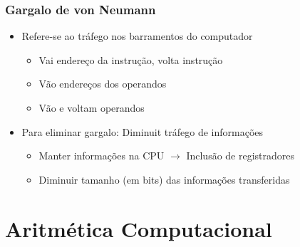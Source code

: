 \documentclass[12pt]{article}
\begin{document}
        \subsubsection{Gargalo de von Neumann}
        \begin{itemize}
            \item Refere-se ao tráfego nos barramentos do computador
            \begin{itemize}
                \item Vai endereço da instrução, volta instrução
                \item Vão endereços dos operandos
                \item Vão e voltam operandos
            \end{itemize}
            \item Para eliminar gargalo: Diminuit tráfego de informações
            \begin{itemize}
                \item Manter informações na CPU $\rightarrow$ Inclusão de 
                registradores
                \item Diminuir tamanho (em bits) das informações transferidas
            \end{itemize}
        \end{itemize}
\section{Aritmética Computacional}
\end{document}
